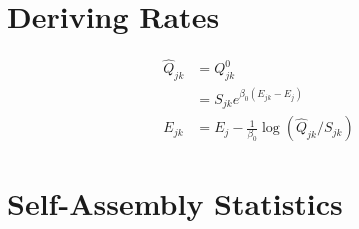 \section{Deriving Rates}

\begin{align}
\hat{Q}_{jk} &= Q^0_{jk} \\
	&= S_{jk}e^{\beta_0(E_{jk} - E_j)} \\
E_{jk} &= E_j-\frac{1}{\beta_0}\log\left(\hat{Q}_{jk}/S_{jk}\right)
\end{align}
\section{Self-Assembly Statistics}

